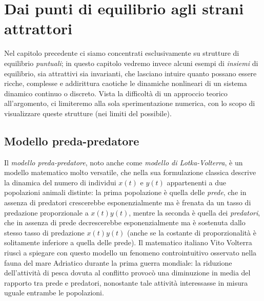 \graphicspath{{./figures/capitolo7/}}
\lstset{inputpath = ./programs/capitolo7}

\chapter{Dai punti di equilibrio agli strani attrattori}

Nel capitolo precedente ci siamo concentrati esclusivamente su strutture
di equilibrio \emph{puntuali}; in questo capitolo vedremo invece alcuni esempi
di \emph{insiemi} di equilibrio, sia attrattivi sia invarianti, che lasciano
intuire quanto possano essere ricche, complesse e addirittura caotiche le dinamiche
nonlineari di un sistema dinamico continuo o discreto. Vista la difficoltà
di un approccio teorico all'argomento, ci limiteremo alla sola sperimentazione
numerica, con lo scopo di visualizzare queste strutture (nei limiti del possibile).

\section{Modello preda-predatore}

Il \emph{modello preda-predatore}, noto anche come \emph{modello di Lotka-Volterra},
è un modello matematico molto versatile, che nella sua formulazione classica
descrive la dinamica del numero di individui $x(t)$ e $y(t)$ appartenenti
a due popolazioni animali distinte: la prima popolazione è quella delle
\emph{prede}, che in assenza di predatori crescerebbe esponenzialmente ma
è frenata da un tasso di predazione proporzionale a $x(t)y(t)$, mentre la
seconda è quella dei \emph{predatori}, che in assenza di prede decrescerebbe
esponenzialmente ma è sostenuta dallo stesso tasso di predazione $x(t)y(t)$
(anche se la costante di proporzionalità è solitamente inferiore a quella delle prede).
Il matematico italiano Vito Volterra riuscì a spiegare con questo modello
un fenomeno controintuitivo osservato nella fauna del mare Adriatico
durante la prima guerra mondiale: la riduzione dell'attività di pesca
dovuta al conflitto provocò una diminuzione in media del rapporto tra
prede e predatori, nonostante tale attività interessasse in misura uguale
entrambe le popolazioni.

